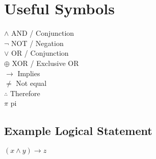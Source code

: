\documentclass{article}
\begin{document}
\section*{Useful Symbols}
$\land$ AND / Conjunction\\
$\neg$ NOT / Negation\\
$\lor$ OR / Conjunction\\
$\oplus$ XOR / Exclusive OR\\
$\to$ Implies\\
$\neq$ Not equal\\
$\therefore$ Therefore \\
$\pi$ pi\\

\subsection*{Example Logical Statement}

$(x \land y) \to z$
\end{document}
